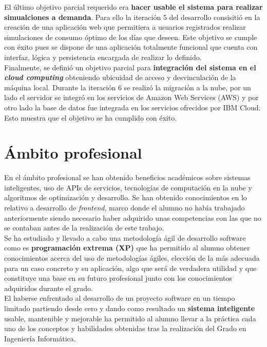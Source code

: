El último objetivo parcial requerido era \textbf{hacer usable el sistema para realizar simualciones a demanda}. Para ello la iteración 5 del desarrollo consisitió en la creación de una aplicación web que permitiera a usuarios registrados realizar simulaciones de consumo óptimo de los días que deseen. Este objetivo se cumple con éxito pues se dispone de una aplicación totalmente funcional que cuenta con interfaz, lógica y persistencia encargada de realizar lo definido.\\

Finalmente, se definió un objetivo parcial para \textbf{integración del sistema en el \textit{cloud computing}} obteniendo ubicuidad de acceso y desvinculación de la máquina local. Durante la iteración 6 se realizó la migración a la nube, por un lado el servidor se integró en los servicios de Amazon Web Services (AWS) y por otro lado la base de datos fue integrada en los servicios ofrecidos por IBM Cloud. Esto muestra que el objetivo se ha cumplido con éxito.\\
\section{Ámbito profesional}
En el ámbito profesional se han obtenido beneficios académicos sobre sistemas inteligentes, uso de APIs de servicios, tecnologías de computación en la nube y algoritmos de optimización y desarrollo. Se han obtenido conocimientos en lo relativo a desarrollo de \textit{frontend}, marco donde el alumno no había trabajado anteriormente siendo necesario haber adquirido unas competencias con las que no se contaban antes de la realización de este trabajo.\\
Se ha estudiado y llevado a cabo una metodología ágil de desarrollo software como es \textbf{programación extrema (XP)} que ha permitido al alumno obtener conocimientos acerca del uso de metodologías ágiles, elección de la más adecuada para un caso concreto y su aplicación, algo que será de verdadera utilidad y que constituye una base en su futuro profesional junto con los conocimientos adquiridos durante el grado.\\

El haberse enfrentado al desarrollo de un proyecto software en un tiempo limitado partiendo desde cero y dando como resultado un \textbf{sistema inteligente} usable, mantenible y mejorable ha permitido al alumno llevar a la práctica cada uno de los conceptos y habilidades obtenidas tras la realización del Grado en Ingeniería Informática.
